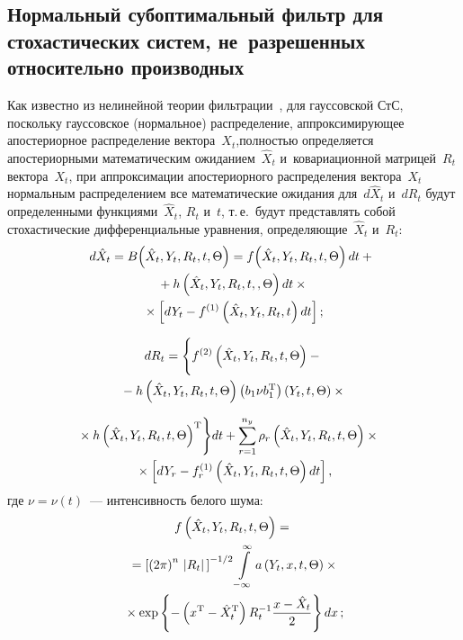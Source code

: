 \begin{multicols}{2}
\section{Нормальный субоптимальный фильтр для стохастических систем, 
не~разрешенных относительно производных}


Как известно из нелинейной теории фильтрации~\cite{10-s}, для гауссовской СтС, поскольку
гауссовское (нормальное) распределение, аппроксимирующее
апостериорное распределение вектора~$X_t$,\linebreak полностью определяется
апостериорными математическим ожиданием~$\hat X_t$ и~ковариационной матрицей~$R_t$ вектора~$X_t$, 
при аппроксимации
апостериорного распределения вектора~$X_t$ нормальным\linebreak
распределением все математические ожидания для~$d\hat X_t$ и~$dR_t$ будут определенными
функциями~$\hat X_t$, $R_t$ и~$t$, т.\,е.\  будут
представлять собой стохастические дифференциальные уравнения,
определяющие~$\hat X_t$ и~$R_t$:
\begin{multline}
\hspace*{-1.53119pt}d\hat X_t =B\!\left(\hat X_t, Y_t, R_t, t, \Theta\right)=
 f \!\left(\hat X_t, Y_t,R_t,t, \Theta\right)dt +{}\\
{}+
    h\left(\hat X_t,Y_t, R_t,t,, \Theta\right)dt\times{}\\
    {}\times \left[ dY_t - f^{(1)} \left(\hat X_t,Y_t, R_t,t\right)dt
    \right];
    \label{e3.1-s}
    \end{multline}
    
    \vspace*{-12pt}
    
    \noindent
    \begin{multline*}
       dR_t=\Biggl\{ f^{(2)}\left(\hat X_t, Y_t,R_t,t, \Theta\right)-{}\\
       {}-
       h\left(\hat    X_t, Y_t,R_t,t, \Theta\right)
       \left(b_1\nu b_1^{\mathrm{T}}\right) \left(Y_t,t, \Theta\right) \times{}
       \end{multline*}
       
      \noindent
       \begin{multline}
        \hspace*{-8pt}{}\times h \left({\hat X}_t, Y_t,R_t,t, \Theta\right)^{\mathrm{T}}\Biggr\} dt+
    \sum\limits_{r=1}^{n_y} \rho_r \left({\hat X}_t,Y_t, R_t,t, \Theta\right)\times{}\\
{}\times \left[
    dY_r -f_r^{(1)}\left({\hat X}_t,Y_t, R_t,t, \Theta\right) dt\right],\label{e3.2-s}
    \end{multline}
где $\nu =\nu(t)$~--- интенсивность белого шума:
\begin{multline}
f\left(\hat X_t, Y_t,R_t,t, \Theta\right)={}\\
{}=\left[\left(2\pi\right)^n \,\left\vert
    R_t\right\vert\,\right]^{-1/2}\int\limits_{-\infty}^\infty a\left(Y_t,x,t, \Theta\right)\times{}\\
    {}\times \exp \left\{ -
    \left(x^{\mathrm{T}}
    -\hat X_t^{\mathrm{T}}\right) R_t^{-1} \displaystyle\frac{\displaystyle x -\hat X_t\mathstrut}{\displaystyle 2\mathstrut}\right\}
    dx\,;\label{e3.3-s}
    \end{multline}
    

\end{multicols}
